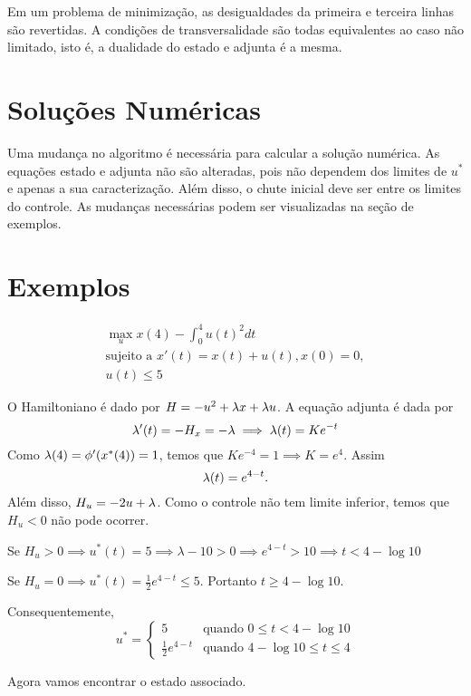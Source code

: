 Em um problema de minimização, as desigualdades da primeira e terceira linhas
são revertidas. A condições de transversalidade são todas equivalentes ao caso
não limitado, isto é, a dualidade do estado e adjunta é a mesma. 

\section{Soluções Numéricas}

Uma mudança no algoritmo é necessária para calcular a solução numérica.  As
equações estado e adjunta não são alteradas, pois não dependem dos limites de
$u^*$ e apenas a sua caracterização.  Além disso, o chute inicial deve ser
entre os limites do controle. As mudanças necessárias podem ser visualizadas na seção de exemplos. 

\section{Exemplos}

\begin{example}
    \begin{gather*}
        \max_u x(4) - \int_0^4 u(t)^2 dt \\ 
        \text{sujeito a  }x'(t) = x(t) + u(t), x(0) = 0, \\
        u(t) \le 5
    \end{gather*}
\end{example}

O Hamiltoniano é dado por $H = -u^2 + \lambda x + \lambda u$. A equação adjunta é
dada por 
$$
\lambda '(t) = -H_x = -\lambda \implies \lambda(t) = Ke^{-t}
$$
Como $\lambda(4) = \phi '(x^*(4)) = 1$, temos que $Ke^{-4} = 1 \implies K =
e^4$. Assim $$\lambda(t) = e^{4 - t}.$$
Além disso, $H_u = -2u + \lambda$. Como o controle não tem limite inferior,
temos que $H_u < 0$ não pode ocorrer. 

Se $H_u > 0 \implies u^{*}(t) = 5 \implies \lambda - 10 > 0 \implies e^{4
- t} > 10 \implies t < 4 - \log 10$

Se $H_u = 0 \implies u^*(t) = \frac{1}{2}e^{4-t} \le 5$. Portanto $t \ge 4
- \log 10$. 

Consequentemente, 
$$
u^* = \begin{cases}
    5 &\text{quando } 0 \le t < 4 -\log 10 \\
    \frac{1}{2}e^{4-t} &\text{quando } 4 - \log 10 \le t \le 4
\end{cases}
$$

Agora vamos encontrar o estado associado. 

